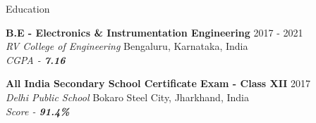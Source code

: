 \documentclass{resume} %
\begin{document}
\begin{rSection}{Education}


{\bf B.E - Electronics \& Instrumentation Engineering}  \hfill {2017 - 2021} \\
\textit{RV College of Engineering} \hfill {Bengaluru, Karnataka, India}\\
\textit{CGPA - \textbf{7.16}}

{\bf All India Secondary School Certificate Exam - Class XII} \hfill{2017} \\ \textit{Delhi Public School} \hfill{Bokaro Steel City, Jharkhand, India} \\ 
\textit{Score - \textbf{91.4\%}}


\end{rSection}
\end{document}
